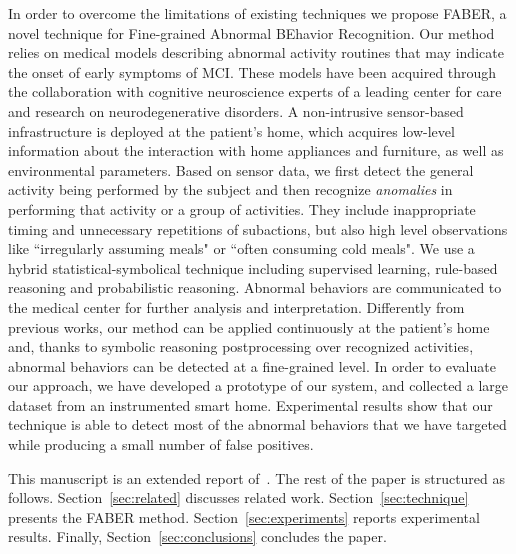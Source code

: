 \documentclass[10pt, conference, compsocconf]{IEEEtran}
\begin{document}
In order to overcome the limitations of existing techniques we propose FABER, a novel technique for Fine-grained Abnormal BEhavior Recognition. Our method relies on medical models describing abnormal activity routines that may indicate the onset of early symptoms of MCI. These models have been acquired through the collaboration with cognitive neuroscience experts of a leading center for care and research on neurodegenerative disorders. A non-intrusive sensor-based infrastructure is deployed at the patient's home, which acquires low-level information about the interaction with home appliances and furniture, as well as environmental parameters. Based on sensor data, we first detect the general activity being performed by the subject and then recognize \emph{anomalies} in performing that activity or a group of activities. They include inappropriate timing and unnecessary repetitions of subactions, but also high level observations like ``irregularly assuming meals" or ``often consuming cold meals". We use a hybrid statistical-symbolical technique including supervised learning, rule-based reasoning and probabilistic reasoning. Abnormal behaviors are communicated to the medical center for further analysis and interpretation.  
Differently from previous works, our method can be applied continuously at the patient's home and, thanks to symbolic reasoning postprocessing over recognized activities, abnormal behaviors can be detected at a fine-grained level.  In order to evaluate our approach, we have developed a prototype of our system, and collected a large dataset from an instrumented smart home. Experimental results show that our technique is able to detect most of the abnormal behaviors that we have targeted while producing a small number of false positives.

This manuscript is an extended report of~\cite{PerCom15}.
The rest of the paper is structured as follows. 
Section~\ref{sec:related} discusses related work. 
Section~\ref{sec:technique} presents the FABER method. 
Section~\ref{sec:experiments} reports experimental results. 
Finally, Section~\ref{sec:conclusions} concludes the paper.
 
\end{document}
